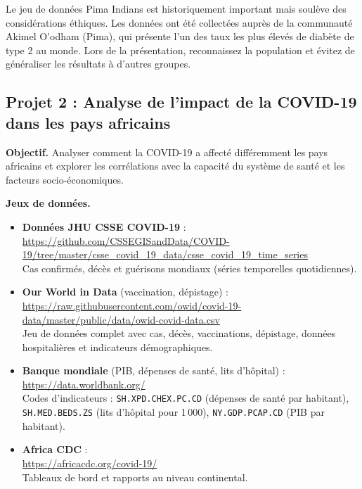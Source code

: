 \begin{clinicalnote}
Le jeu de donn\'ees Pima Indians est historiquement important mais soul\`eve des consid\'erations \'ethiques. Les donn\'ees ont \'et\'e collect\'ees aupr\`es de la communaut\'e Akimel O'odham (Pima), qui pr\'esente l'un des taux les plus \'elev\'es de diab\`ete de type 2 au monde. Lors de la pr\'esentation, reconnaissez la population et \'evitez de g\'en\'eraliser les r\'esultats \`a d'autres groupes.
\end{clinicalnote}

\subsection{Projet 2 : Analyse de l'impact de la COVID-19 dans les pays africains}

\textbf{Objectif.} Analyser comment la COVID-19 a affect\'e diff\'eremment les pays africains et explorer les corr\'elations avec la capacit\'e du syst\`eme de sant\'e et les facteurs socio-\'economiques.

\textbf{Jeux de donn\'ees.}
\begin{itemize}
  \item \textbf{Donn\'ees JHU CSSE COVID-19} :\\
  \url{https://github.com/CSSEGISandData/COVID-19/tree/master/csse_covid_19_data/csse_covid_19_time_series}\\
  Cas confirm\'es, d\'ec\`es et gu\'erisons mondiaux (s\'eries temporelles quotidiennes).
  \item \textbf{Our World in Data} (vaccination, d\'epistage) :\\
  \url{https://raw.githubusercontent.com/owid/covid-19-data/master/public/data/owid-covid-data.csv}\\
  Jeu de donn\'ees complet avec cas, d\'ec\`es, vaccinations, d\'epistage, donn\'ees hospitali\`eres et indicateurs d\'emographiques.
  \item \textbf{Banque mondiale} (PIB, d\'epenses de sant\'e, lits d'h\^opital) :\\
  \url{https://data.worldbank.org/}\\
  Codes d'indicateurs : \texttt{SH.XPD.CHEX.PC.CD} (d\'epenses de sant\'e par habitant), \texttt{SH.MED.BEDS.ZS} (lits d'h\^opital pour 1\,000), \texttt{NY.GDP.PCAP.CD} (PIB par habitant).
  \item \textbf{Africa CDC} :\\
  \url{https://africacdc.org/covid-19/}\\
  Tableaux de bord et rapports au niveau continental.
\end{itemize}

